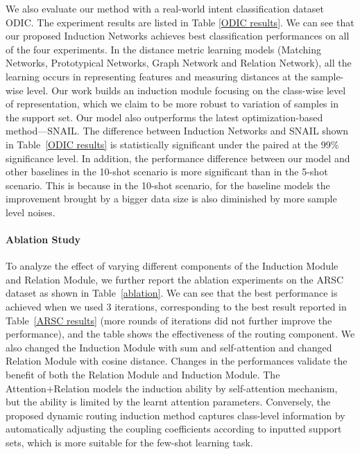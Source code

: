 \documentclass[11pt,a4paper]{article}
\begin{document}
We also evaluate our method with a real-world intent classification dataset ODIC. The experiment results are listed in Table \ref{ODIC results}. We can see that our proposed Induction Networks achieves best classification performances on all of the four experiments. In the distance metric learning models (Matching Networks, Prototypical Networks, Graph Network and Relation Network), all the learning occurs in representing features and measuring distances at the sample-wise level. Our work builds an induction module focusing on the class-wise level of representation, which we claim to be more robust to variation of samples in the support set. Our model also outperforms the latest optimization-based method---SNAIL. The difference between Induction Networks and SNAIL shown in Table~\ref{ODIC results} is statistically significant under the paired at the 99\% significance level. 
In addition, the performance difference between our model and other baselines in the 10-shot scenario is more significant than in the 5-shot scenario. This is because in the 10-shot scenario, for the baseline models the improvement brought by a bigger data size is also diminished by more sample level noises.




\paragraph{Ablation Study} To analyze the effect of varying different components of the Induction Module and Relation Module, we further report the ablation experiments on the ARSC dataset as shown in Table~\ref{ablation}. We can see that the best performance is achieved when we used $3$ iterations, corresponding to the best result reported in Table~\ref{ARSC results} (more rounds of iterations did not further improve the performance), and the table shows the effectiveness of the routing component.
We also changed the Induction Module with sum and self-attention and changed Relation Module with cosine distance. Changes in the performances validate the benefit of both the Relation Module and Induction Module. The Attention+Relation models the induction ability by self-attention mechanism, but the ability is limited by the learnt attention parameters. Conversely, the proposed dynamic routing induction method captures class-level information by automatically adjusting the coupling coefficients according to inputted support sets, which is more suitable for the few-shot learning task.
\end{document}
